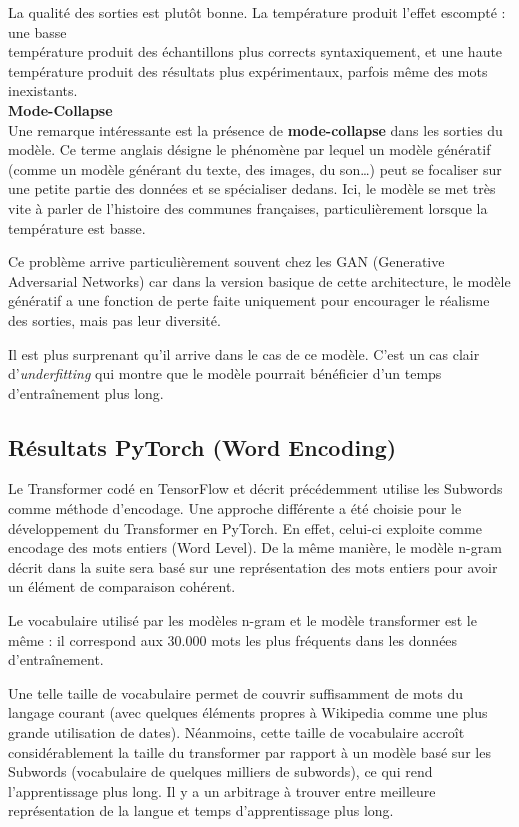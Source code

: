 La qualité des sorties est plutôt bonne. La température produit l'effet
escompté : une basse \\
température produit des échantillons plus corrects
syntaxiquement, et une haute température produit des résultats plus
expérimentaux, parfois même des mots inexistants. \\

\textbf{Mode-Collapse} \\

Une remarque intéressante est la présence de \textbf{mode-collapse} dans
les sorties du modèle. Ce terme anglais désigne le phénomène par lequel
un modèle génératif (comme un modèle générant du texte, des images, du
son\ldots{}) peut se focaliser sur une petite partie des données et se
spécialiser dedans. Ici, le modèle se met très vite à parler de
l'histoire des communes françaises, particulièrement lorsque la
température est basse.

Ce problème arrive particulièrement souvent chez les GAN (Generative
Adversarial Networks) car dans la version basique de cette architecture,
le modèle génératif a une fonction de perte faite uniquement pour
encourager le réalisme des sorties, mais pas leur diversité.

Il est plus surprenant qu'il arrive dans le cas de ce modèle. C'est un
cas clair d'\textit{underfitting} qui montre que le modèle pourrait
bénéficier d'un temps d'entraînement plus long.

\newpage

\subsection{Résultats PyTorch (Word Encoding)}

Le Transformer codé en TensorFlow et décrit précédemment utilise les Subwords
comme méthode d’encodage. Une approche différente a été choisie pour le
développement du Transformer en PyTorch. En effet, celui-ci exploite comme
encodage des mots entiers (Word Level). De la même manière, le modèle n-gram
décrit dans la suite sera basé sur une représentation des mots entiers
pour avoir un élément de comparaison cohérent.

Le vocabulaire utilisé par les modèles n-gram et le modèle transformer
est le même : il correspond aux 30.000 mots les plus fréquents
dans les données d'entraînement.

Une telle taille de vocabulaire permet de couvrir suffisamment de mots du langage
courant (avec quelques éléments propres à Wikipedia comme une plus grande utilisation de dates).
Néanmoins, cette taille de vocabulaire accroît considérablement la taille du transformer
par rapport à un modèle basé sur les Subwords (vocabulaire de quelques milliers de subwords), ce qui rend l’apprentissage plus long. Il y a un arbitrage à trouver entre meilleure représentation de la langue et temps d’apprentissage plus long.

